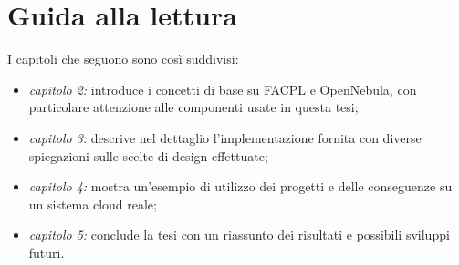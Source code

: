 \section{Guida alla lettura}
I capitoli che seguono sono così suddivisi:
\begin{itemize}
    \item \emph{capitolo 2:} introduce i concetti di base su FACPL e OpenNebula, con particolare attenzione alle componenti usate in questa tesi;
    \item \emph{capitolo 3:} descrive nel dettaglio l'implementazione fornita con diverse spiegazioni sulle scelte di design effettuate;
    \item \emph{capitolo 4:} mostra un'esempio di utilizzo dei progetti e delle conseguenze su un sistema cloud reale;
    \item \emph{capitolo 5:} conclude la tesi con un riassunto dei risultati e possibili sviluppi futuri.
\end{itemize}
